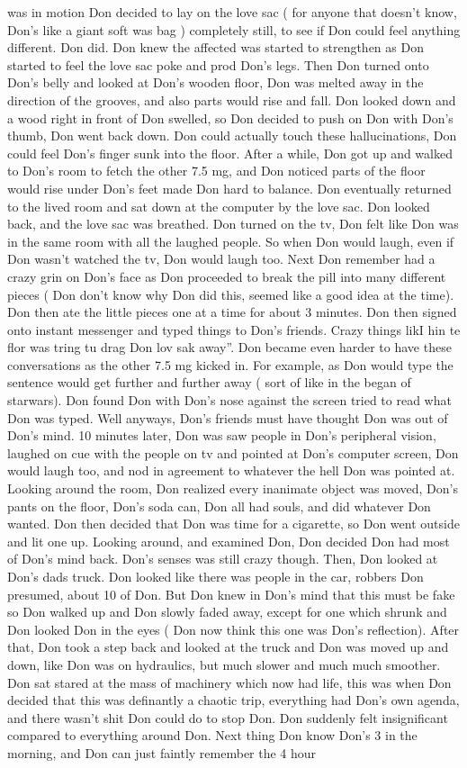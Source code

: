 \documentclass[12pt]{book}
\begin{document}
was in motion Don decided to lay on the love sac ( for anyone that doesn't know, Don's like a giant soft was bag ) completely still, to see if Don could feel anything different. Don did. Don knew the affected was started to strengthen as Don started to feel the love sac poke and prod Don's legs. Then Don turned onto Don's belly and looked at Don's wooden floor, Don was melted away in the direction of the grooves, and also parts would rise and fall. Don looked down and a wood right in front of Don swelled, so Don decided to push on Don with Don's thumb, Don went back down. Don could actually touch these hallucinations, Don could feel Don's finger sunk into the floor. After a while, Don got up and walked to Don's room to fetch the other 7.5 mg, and Don noticed parts of the floor would rise under Don's feet made Don hard to balance. Don eventually returned to the lived room and sat down at the computer by the love sac. Don looked back, and the love sac was breathed. Don turned on the tv, Don felt like Don was in the same room with all the laughed people. So when Don would laugh, even if Don wasn't watched the tv, Don would laugh too. Next Don remember had a crazy grin on Don's face as Don proceeded to break the pill into many different pieces ( Don don't know why Don did this, seemed like a good idea at the time). Don then ate the little pieces one at a time for about 3 minutes. Don then signed onto instant messenger and typed things to Don's friends. Crazy things likI hin te flor was tring tu drag Don lov sak away''. Don became even harder to have these conversations as the other 7.5 mg kicked in. For example, as Don would type the sentence would get further and further away ( sort of like in the began of starwars). Don found Don with Don's nose against the screen tried to read what Don was typed. Well anyways, Don's friends must have thought Don was out of Don's mind. 10 minutes later, Don was saw people in Don's peripheral vision, laughed on cue with the people on tv and pointed at Don's computer screen, Don would laugh too, and nod in agreement to whatever the hell Don was pointed at. Looking around the room, Don realized every inanimate object was moved, Don's pants on the floor, Don's soda can, Don all had souls, and did whatever Don wanted. Don then decided that Don was time for a cigarette, so Don went outside and lit one up. Looking around, and examined Don, Don decided Don had most of Don's mind back. Don's senses was still crazy though. Then, Don looked at Don's dads truck. Don looked like there was people in the car, robbers Don presumed, about 10 of Don. But Don knew in Don's mind that this must be fake so Don walked up and Don slowly faded away, except for one which shrunk and Don looked Don in the eyes ( Don now think this one was Don's reflection). After that, Don took a step back and looked at the truck and Don was moved up and down, like Don was on hydraulics, but much slower and much much smoother. Don sat stared at the mass of machinery which now had life, this was when Don decided that this was definantly a chaotic trip, everything had Don's own agenda, and there wasn't shit Don could do to stop Don. Don suddenly felt insignificant compared to everything around Don. Next thing Don know Don's 3 in the morning, and Don can just faintly remember the 4 hour 
\end{document}

